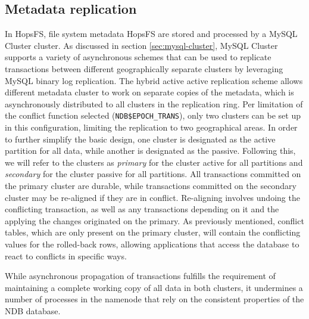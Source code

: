 \subsection{Metadata replication}
In HopsFS, file system metadata HopsFS are stored and processed by a MySQL Cluster cluster.
As discussed in section \ref{sec:mysql-cluster}, MySQL Cluster supports a variety of asynchronous schemes that can be used to replicate transactions between different geographically separate clusters by leveraging MySQL binary log replication.
The hybrid active active replication scheme allows different metadata cluster to work on separate copies of the metadata, which is asynchronously distributed to all clusters in the replication ring.
Per limitation of the conflict function selected (\texttt{NDB\$EPOCH\_TRANS}), only two clusters can be set up in this configuration, limiting the replication to two geographical areas.
In order to further simplify the basic design, one cluster is designated as the active partition for all data, while another is designated as the passive.
Following this, we will refer to the clusters as \emph{primary} for the cluster active for all partitions and \emph{secondary} for the cluster passive for all partitions. 
All transactions committed on the primary cluster are durable, while transactions committed on the secondary cluster may be re-aligned if they are in conflict.
Re-aligning involves undoing the conflicting transaction, as well as any transactions depending on it and the applying the changes originated on the primary.
As previously mentioned, conflict tables, which are only present on the primary cluster, will contain the conflicting values for the rolled-back rows, allowing applications that access the database to react to conflicts in specific ways.

While asynchronous propagation of transactions fulfills the requirement of maintaining a complete working copy of all data in both clusters, it undermines a number of processes in the namenode that rely on the consistent properties of the NDB database.

